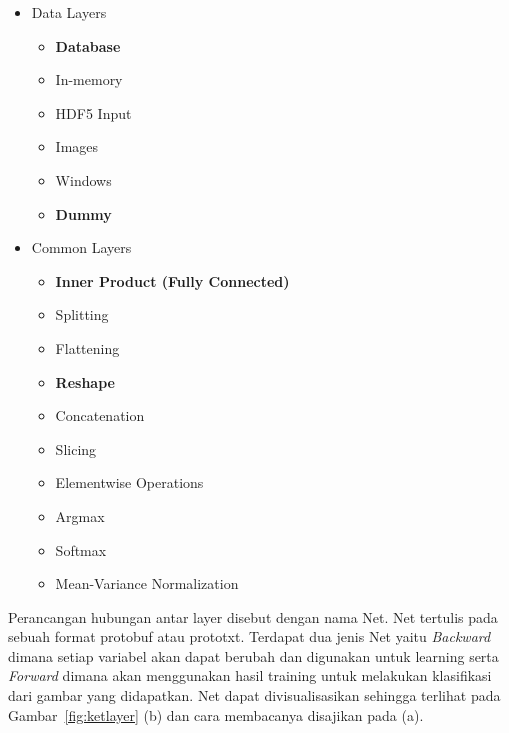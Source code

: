 \begin{itemize}
 \item Data Layers
   \begin{itemize}
  \item \textbf{Database}
  \item In-memory
  \item HDF5 Input
  \item Images
  \item Windows
  \item \textbf{Dummy}
 \end{itemize}
 \item Common Layers
   \begin{itemize}
  \item \textbf{Inner Product (Fully Connected)}
  \item Splitting
  \item Flattening
  \item \textbf{Reshape}
  \item Concatenation
  \item Slicing
  \item Elementwise Operations
  \item Argmax
  \item Softmax
  \item Mean-Variance Normalization
 \end{itemize}
\end{itemize}

Perancangan hubungan antar layer disebut dengan nama Net. Net tertulis pada sebuah format protobuf atau prototxt. Terdapat dua jenis Net yaitu \textit{Backward} dimana setiap variabel akan dapat berubah dan digunakan untuk learning serta \textit{Forward} dimana akan menggunakan hasil training untuk melakukan klasifikasi dari gambar yang didapatkan. Net dapat divisualisasikan sehingga terlihat pada Gambar~\ref{fig:ketlayer} (b) dan cara membacanya disajikan pada (a).


